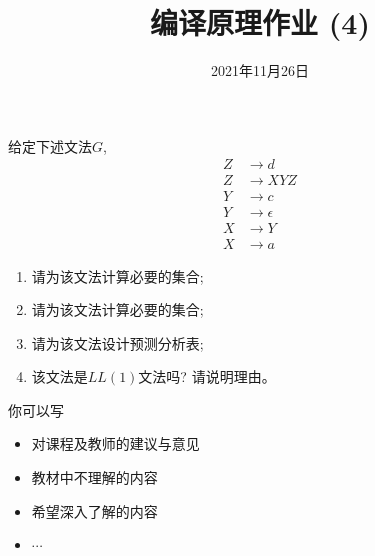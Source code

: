 \documentclass[a4paper, justified]{tufte-handout}
\title{编译原理作业 (4)}
\date{2021年11月26日}
\begin{document}
\maketitle
\noplagiarism %
\begin{abstract}
\end{abstract}
\beginrequired

\begin{problem}[\score{10 = 2 + 2 + 2 + 1 + 3}]
  给定下述文法$G$,
  \begin{align}
    Z &\to d \\[8pt]
    Z &\to XYZ \\[8pt]
    Y &\to c \\[8pt]
    Y &\to \epsilon \\[8pt]
    X &\to Y \\[8pt]
    X &\to a
  \end{align}

  \begin{enumerate}[(1)]
    \item 请为该文法计算必要的\first{}集合;
    \item 请为该文法计算必要的\follow{}集合;
    \item 请为该文法设计预测分析表;
    \item 该文法是$LL(1)$文法吗? 请说明理由。
  \end{enumerate}
\end{problem}

\begin{solution}
\end{solution}



\beginfb

你可以写
\begin{itemize}
  \item 对课程及教师的建议与意见
  \item 教材中不理解的内容
  \item 希望深入了解的内容
  \item $\cdots$
\end{itemize}
\end{document}
